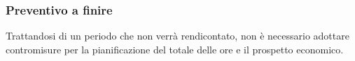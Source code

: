\documentclass[../piano-di-progetto.tex]{subfiles}
\begin{document}
\subsubsection{Preventivo a finire}
Trattandosi di un periodo che non verrà rendicontato, non è necessario adottare contromisure per la pianificazione del totale delle ore e il prospetto economico.












\end{document}
